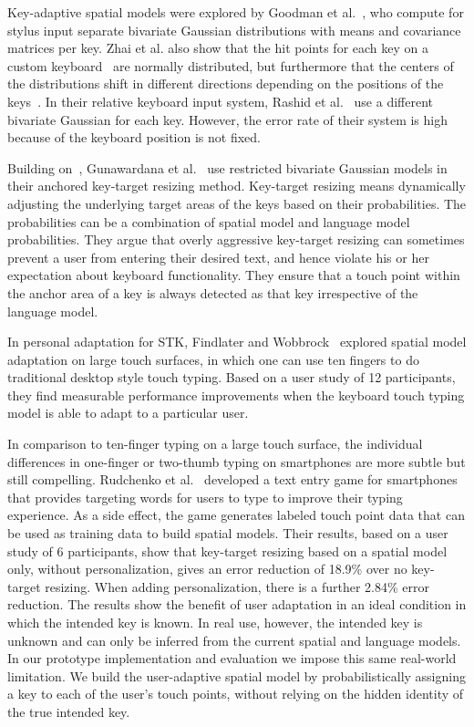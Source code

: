 \documentclass{sigchi}
\begin{document}
Key-adaptive spatial models were explored by Goodman et al.~\cite{Goodman:2002}, who compute for stylus input separate bivariate Gaussian distributions with means and
covariance matrices per key. Zhai et al. also show that
the hit points for each key on a custom keyboard~\cite{Zhai:2000} are normally distributed, but furthermore that the centers of the distributions shift in different directions depending on the positions of
the keys~\cite{Zhai:2002}. In their relative keyboard input system, Rashid et al.~\cite{Rashid:2008} use a different bivariate Gaussian for each key. However, the error rate of their system is high because of the keyboard position is not fixed.

Building on~\cite{Goodman:2002}, Gunawardana et al.~\cite{Gunawardana:2010} use restricted bivariate Gaussian
models in their anchored key-target resizing method. Key-target resizing means dynamically
adjusting the underlying target areas of the keys based on their probabilities. The probabilities can
be a combination of spatial model and language model probabilities.
They argue that overly aggressive
key-target resizing can sometimes prevent a user from entering their desired text, and hence violate
his or her expectation about keyboard functionality. They ensure that a touch point within
the anchor area of a key is always detected as that key irrespective of the language model.

In personal adaptation for STK, Findlater and
Wobbrock~\cite{Findlater:2012} explored spatial model adaptation on large touch
surfaces, in which one can use ten fingers to do traditional desktop style touch
typing. Based on a user study of 12 participants, they find measurable
performance improvements when the keyboard touch typing model is able to adapt to a particular user.

In comparison to ten-finger typing on a large touch surface, the individual
differences in one-finger or two-thumb typing on smartphones are more subtle but
still compelling. Rudchenko et al.~\cite{Rudchenko:2011} developed a text entry
game for smartphones that provides targeting words for users to type to improve
their typing experience. As a side effect, the game generates labeled touch
point data that can be used as training data to build spatial models.
Their results, based on a user study of 6 participants, show that key-target
resizing based on a spatial model only, without personalization, gives an error reduction of 18.9\% over no key-target resizing.
When adding personalization, there is a further 2.84\% error reduction.
The results show the benefit of user adaptation in an ideal condition
in which the intended key is known. In real use, however, the intended key is unknown and can only be inferred from the current spatial
and language models. In our prototype implementation and evaluation we impose
this same real-world limitation. We build the user-adaptive spatial model by
probabilistically assigning a key to each of the user's touch points, without
relying on the hidden identity of the true intended key.
\end{document}

